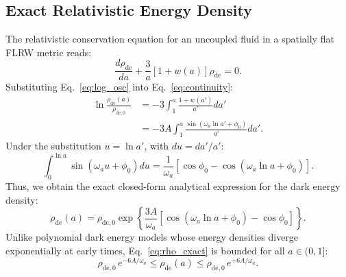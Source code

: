 \subsection{Exact Relativistic Energy Density}
The relativistic conservation equation for an uncoupled fluid in a spatially flat FLRW metric reads:
\begin{equation}
\frac{d\rho_{\mathrm{de}}}{da} + \frac{3}{a} \left[ 1 + w(a) \right] \rho_{\mathrm{de}} = 0.
\label{eq:continuity}
\end{equation}
Substituting Eq.~\eqref{eq:log_osc} into Eq.~\eqref{eq:continuity}:
\begin{align}
\ln \frac{\rho_{\mathrm{de}}(a)}{\rho_{\mathrm{de}, 0}} &= -3 \int_1^a \frac{1 + w(a')}{a'} da' \nonumber \\
&= -3 A \int_1^a \frac{\sin(\omega_a \ln a' + \phi_0)}{a'} da'.
\end{align}
Under the substitution $u = \ln a'$, with $du = da'/a'$:
\begin{equation}
\int_0^{\ln a} \sin(\omega_a u + \phi_0) du = \frac{1}{\omega_a} \left[ \cos\phi_0 - \cos(\omega_a \ln a + \phi_0) \right].
\end{equation}
Thus, we obtain the exact closed-form analytical expression for the dark energy density:
\begin{equation}
\rho_{\mathrm{de}}(a) = \rho_{\mathrm{de}, 0} \exp\left\{ \frac{3A}{\omega_a} \left[ \cos(\omega_a \ln a + \phi_0) - \cos\phi_0 \right] \right\}.
\label{eq:rho_exact}
\end{equation}
Unlike polynomial dark energy models whose energy densities diverge exponentially at early times, Eq.~\eqref{eq:rho_exact} is bounded for all $a \in (0, 1]$:
\begin{equation}
\rho_{\mathrm{de}, 0} \, e^{-6A/\omega_a} \le \rho_{\mathrm{de}}(a) \le \rho_{\mathrm{de}, 0} \, e^{+6A/\omega_a}.
\end{equation}

